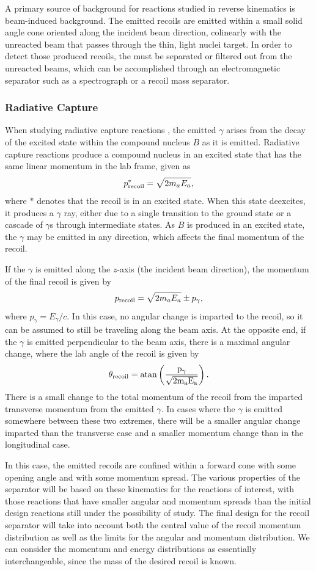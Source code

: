 A primary source of background for reactions studied in reverse kinematics is
beam-induced background. The emitted recoils are emitted within a small solid
angle cone oriented along the incident beam direction, colinearly with the
unreacted beam that passes through the thin, light nuclei target. In order to
detect those produced recoils, the must be separated or filtered out from the
unreacted beams, which can be accomplished through an electromagnetic separator
such as a spectrograph or a recoil mass separator.

\subsubsection{Radiative Capture}
When studying radiative capture reactions , the emitted
$\gamma$ arises from the decay of the excited state within the compound nucleus
$B$ as it is emitted. Radiative capture reactions produce a compound nucleus in
an excited state that
has the same linear momentum in the lab frame, given as
\[
    p^*_{\rm{recoil}} = \sqrt{2m_aE_a},
\]
where $*$ denotes that the recoil is in an excited state. When this state
deexcites, it produces a $\gamma$ ray, either due to a single transition to
the ground state or a cascade of $\gamma$s through intermediate states. As $B$
is produced in an excited state, the $\gamma$ may be emitted in any direction,
which affects the final momentum of the recoil.

If the $\gamma$ is emitted along the $z$-axis (the incident beam direction),
the momentum of the final recoil is given by
\[
    p_{\rm{recoil}} = \sqrt{2m_aE_a} \pm p_{\gamma},
\]
where $p_{\gamma} = E_{\gamma}/c$. In this case, no angular change is imparted
to the recoil, so it can be assumed to still be traveling along the beam axis.
At the opposite end, if the $\gamma$ is emitted perpendicular to the beam axis,
there is a maximal angular change, where the lab angle of the recoil is
given by
\[
    \theta_{\rm{recoil}} = \rm{atan}\left(\frac{p_{\gamma}}{\sqrt{2m_aE_a}}\right).
\]
There is a small change to the total momentum of the recoil from the imparted
transverse momentum from the emitted $\gamma$. In cases where the $\gamma$ is
emitted somewhere between these two extremes, there will be a smaller angular
change imparted than the transverse case and a smaller momentum change than in
the longitudinal case.

In this case, the emitted recoils are confined within a forward cone with
some opening angle and with some momentum spread. The various properties of
the separator will be based on these kinematics for the reactions of interest,
with those reactions that have smaller angular and momentum spreads than the
initial design reactions still under the possibility of study. The final design
for the recoil separator will take into account both the central value of the
recoil momentum distribution as well as the limits for the angular and momentum
distribution. We can consider the momentum and energy distributions as
essentially interchangeable, since the mass of the desired recoil is known.

